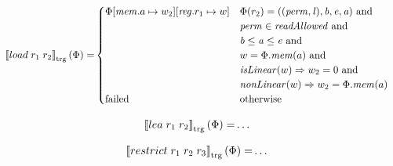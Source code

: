 \documentclass[a4paper]{article}
\newcommand{\sem}[1]{\left\llbracket #1 \right\rrbracket}
\newcommand{\tsem}[2][\Phi]{\sem{#2}_{\mathrm{trg}}(#1)}
\newcommand{\tand}{\text{ and }}
\newcommand{\totherwise}{\text{otherwise }}
\newcommand{\targetcolor}[1]{\color{black}}
\newcommand{\trg}[1]{{\targetcolor{} #1}}
\newcommand{\zinstr}[1]{#1}
\newcommand{\twoinstr}[3]{
  \ifthenelse{\equal{#2#3}{}}
  {\zinstr{#1}}
  {\zinstr{#1} \; #2 \; #3}
}
\newcommand{\threeinstr}[4]{
  \ifthenelse{\equal{#2#3#4}{}}
  {\zinstr{#1}}
  {\zinstr{#1} \; #2 \; #3 \; #4}
}
\newcommand{\tload}[2]{\twoinstr{\trg{load}}{#1}{#2}}
\newcommand{\tlea}[2]{\twoinstr{\trg{lea}}{#1}{#2}}
\newcommand{\trestrict}[3]{\threeinstr{\trg{restrict}}{#1}{#2}{#3}}
\newcommand{\update}[2]{[#1 \mapsto #2]}
\newcommand{\updReg}[2]{\update{\reg.#1}{#2}}
\newcommand{\perm}{\var{perm}}
\newcommand{\lin}{\var{l}}
\newcommand{\failed}{\mathrm{failed}}
\newcommand{\var}[1]{\mathit{#1}}
\newcommand{\reg}{\var{reg}}
\newcommand{\mem}{\var{mem}}
\newcommand{\baddr}{\var{b}}
\newcommand{\eaddr}{\var{e}}
\newcommand{\aaddr}{\var{a}}
\newcommand{\plainfun}[2]{
  \ifthenelse{\equal{#2}{}}
  {\mathit{#1}}
  {\mathit{#1}(#2)}
}
\newcommand{\readAllowed}[1]{\plainfun{readAllowed}{#1}}
\newcommand{\nonLinear}[1]{\plainfun{nonLinear}{#1}}
\newcommand{\isLinear}[1]{\plainfun{isLinear}{#1}}
\begin{document}
\begin{align*}
  \tsem{\tload{r_1}{r_2}} = & 
                              \begin{cases}
                                \Phi\update{\mem.a}{w_2}\updReg{r_1}{w} &
                                \arraycolsep=0pt
                                \begin{array}[t]{l}
                                  \Phi(r_2) = ((\perm,\lin),\baddr,\eaddr,\aaddr) \tand \\
                                  \perm \in \readAllowed{} \tand \\
                                  \baddr \leq \aaddr \leq \eaddr \tand \\
                                  w = \Phi.\mem(a) \tand \\
                                  \isLinear{w} \Rightarrow w_2 = 0 \tand \\
                                  \nonLinear{w} \Rightarrow w_2 = \Phi.\mem(a)
                                \end{array} \\
                                \failed & \totherwise
                              \end{cases}
\end{align*}

\begin{align*}
  \tsem{\tlea{r_1}{r_2}} = & \dots
\end{align*}

\begin{align*}
  \tsem{\trestrict{r_1}{r_2}{r_3}} = & \dots
\end{align*}
\end{document}
